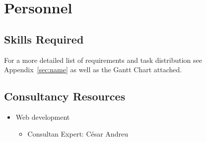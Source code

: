 \section{Personnel}

\subsection{Skills Required}

For a more detailed list of requirements and task distribution see Appendix~\ref{sec:name} as well as the Gantt Chart attached.
\subsection{Consultancy Resources}
\begin{itemize}
\item Web development
\begin{itemize}
\item Consultan Expert: César Andreu
\end{itemize}
\end{itemize}